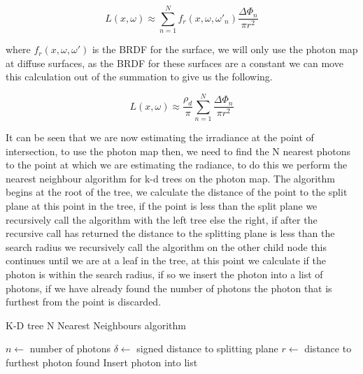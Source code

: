 \begin{equation}
L(x, \omega) \approx \sum\limits_{n = 1}^N f_r(x,\omega,\omega'_n) \frac{\Delta\Phi_n}{\pi r ^ 2}
\end{equation}

where $f_r(x, \omega,\omega')$ is the BRDF for the surface, we will only use the photon map at diffuse surfaces, as the BRDF
for these surfaces are a constant we can move this calculation out of the summation to give us the following.

\begin{equation}
L(x, \omega) \approx \frac{\rho_d}{\pi}\sum\limits_{n = 1}^N \frac{\Delta\Phi_n}{\pi r ^ 2}
\end{equation}

It can be seen that we are now estimating the irradiance at the point of intersection, to use the photon map then, we need to
find the N nearest photons to the point at which we are estimating the radiance, to do this we perform the nearest neighbour
algorithm for k-d trees on the photon map. The algorithm begins at the root of the tree, we calculate the distance of the point
to the split plane at this point in the tree, if the point is less than the split plane we recursively call the algorithm with
the left tree else the right, if after the recursive call has returned the distance to the splitting plane is less than the
search radius we recursively call the algorithm on the other child node
this continues until we are at a leaf in the tree, at this point we calculate if the photon
is within the search radius, if so we insert the photon into a list of photons, if we have already found the number of photons
the photon that is furthest from the point is discarded.

\begin{algorithm}
\begin{algorithmic}
\caption{K-D tree N Nearest Neighbours algorithm}
\State $n \gets $ number of photons
\State $\delta \gets$ signed distance to splitting plane
\State $r \gets $ distance to furthest photon found
		\State {}
			\State {}
		\EndIf
	\Else
		\State {}
			\State {}
		\EndIf
	\EndIf
		\State Insert photon into list
	\EndIf
\EndIf
\EndFunction
\end{algorithmic}
\end{algorithm}

